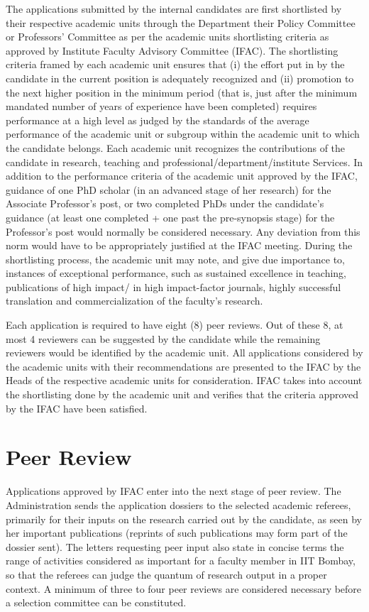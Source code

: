 \documentclass[
  10pt,
  a5paper,
  10pt,
  openany]{amsbook}
\begin{document}
The applications submitted by the internal candidates are first
shortlisted by their respective academic units through the Department
their Policy Committee or Professors' Committee as per the academic
units shortlisting criteria as approved by Institute Faculty Advisory
Committee (IFAC). The shortlisting criteria framed by each academic unit
ensures that (i) the effort put in by the candidate in the current
position is adequately recognized and (ii) promotion to the next higher
position in the minimum period (that is, just after the minimum mandated
number of years of experience have been completed) requires performance
at a high level as judged by the standards of the average performance of
the academic unit or subgroup within the academic unit to which the
candidate belongs. Each academic unit recognizes the contributions of
the candidate in research, teaching and
professional/department/institute Services. In addition to the
performance criteria of the academic unit approved by the IFAC, guidance
of one PhD scholar (in an advanced stage of her research) for the
Associate Professor's post, or two completed PhDs under the candidate's
guidance (at least one completed + one past the pre-synopsis stage) for
the Professor's post would normally be considered necessary. Any
deviation from this norm would have to be appropriately justified at the
IFAC meeting. During the shortlisting process, the academic unit may
note, and give due importance to, instances of exceptional performance,
such as sustained excellence in teaching, publications of high impact/
in high impact-factor journals, highly successful translation and
commercialization of the faculty's research.

Each application is required to have eight (8) peer reviews. Out of
these 8, at most 4 reviewers can be suggested by the candidate while the
remaining reviewers would be identified by the academic unit. All
applications considered by the academic units with their recommendations
are presented to the IFAC by the Heads of the respective academic units
for consideration. IFAC takes into account the shortlisting done by the
academic unit and verifies that the criteria approved by the IFAC have
been satisfied.

\section{Peer Review}\label{peer-review}

Applications approved by IFAC enter into the next stage of peer review.
The Administration sends the application dossiers to the selected
academic referees, primarily for their inputs on the research carried
out by the candidate, as seen by her important publications (reprints of
such publications may form part of the dossier sent). The letters
requesting peer input also state in concise terms the range of
activities considered as important for a faculty member in IIT Bombay,
so that the referees can judge the quantum of research output in a
proper context. A minimum of three to four peer reviews are considered
necessary before a selection committee can be constituted.
\end{document}

